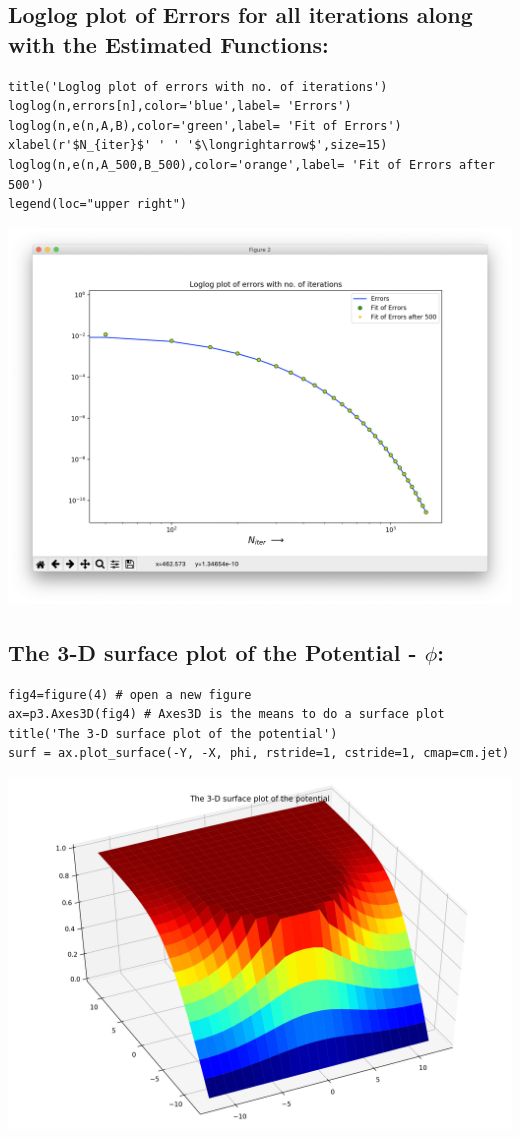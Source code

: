 \documentclass[10pt,english, openany]{book}
\begin{document}
\subsection{Loglog plot of Errors for all iterations along with the Estimated Functions:}
\begin{verbatim}
title('Loglog plot of errors with no. of iterations')
loglog(n,errors[n],color='blue',label= 'Errors')
loglog(n,e(n,A,B),color='green',label= 'Fit of Errors') 
xlabel(r'$N_{iter}$' ' ' '$\longrightarrow$',size=15)
loglog(n,e(n,A_500,B_500),color='orange',label= 'Fit of Errors after 500')
legend(loc="upper right")
\end{verbatim}
{\centering\includegraphics[scale=0.4]{Figure_2.png}}
\newpage
\subsection{The 3-D surface plot of the Potential - $\phi$:}
\begin{verbatim}
fig4=figure(4) # open a new figure
ax=p3.Axes3D(fig4) # Axes3D is the means to do a surface plot
title('The 3-D surface plot of the potential')
surf = ax.plot_surface(-Y, -X, phi, rstride=1, cstride=1, cmap=cm.jet)
\end{verbatim}
{\centering\includegraphics[scale=0.7]{Figure_4.png}}
\newpage
\end{document}
